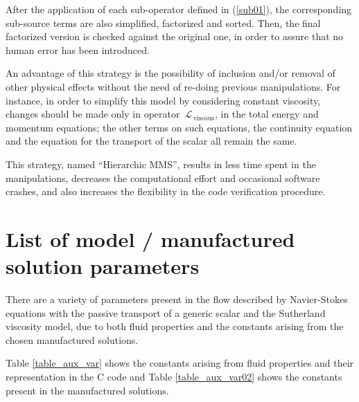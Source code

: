 \documentclass[10pt]{article}
\newcommand{\Lo}{\,\mathcal{L}}
\newcommand{\viscous}{\,\text{viscous}}
\begin{document}
After the application of each sub-operator defined in (\ref{sub01}), the corresponding sub-source terms are also simplified, factorized and sorted. Then, the final factorized version is checked against the original one, in order to assure that no human error has been introduced.

An advantage of this strategy is the possibility of inclusion and/or removal of other physical effects without the need of re-doing previous manipulations. For instance, in order to simplify this model by considering constant viscosity, changes should be made only in operator  $\Lo_{\viscous}$, in the total energy and momentum equations; the other terms on such equations, the continuity equation and the equation for the transport of the scalar all remain the same. 

This strategy, named ``Hierarchic MMS'', results in less time spent in the manipulations, decreases the computational effort and occasional software crashes, and also increases the flexibility in the code verification procedure.

\appendix


\section{List of model / manufactured solution parameters}\label{Appendix:01}

There are a variety of parameters present in the flow described by Navier-Stokes equations with the passive transport of a generic scalar and the Sutherland viscosity model, due to both fluid properties and the constants arising from the chosen manufactured solutions.



Table \ref{table_aux_var} shows the constants arising from fluid properties and their representation in the C code and Table \ref{table_aux_var02} shows the constants present in the manufactured solutions.
\end{document}

